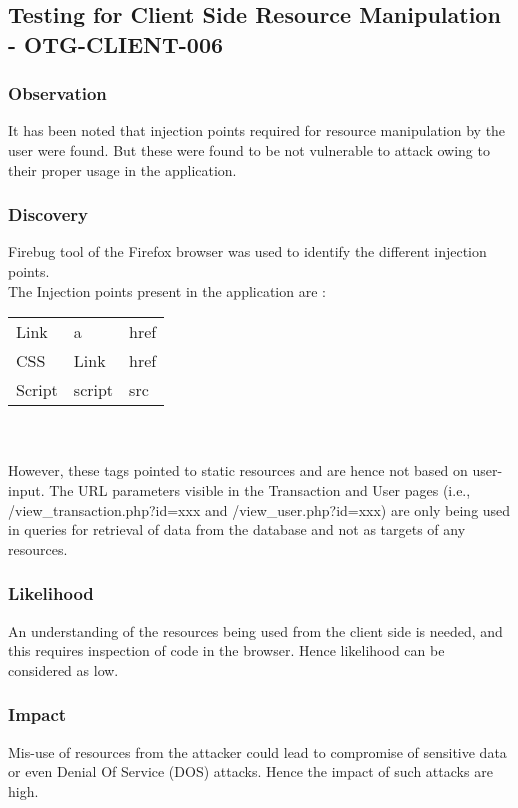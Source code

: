 \subsection{Testing for Client Side Resource Manipulation - OTG-CLIENT-006}

\subsubsection{Observation}
It has been noted that injection points required for resource manipulation by the user were found. But these were found to be not vulnerable to attack owing to their proper usage in the application.

\subsubsection{Discovery}
Firebug tool of the Firefox browser was used to identify the different injection points.\\
The Injection points present in the application are :\\
\begin{tabular}{l | l | l}
Link & a  & href \\
CSS & Link	& href \\
Script & script & src \\
\end{tabular}
\\\\However, these tags pointed to static resources and are hence not based on user-input.
The URL parameters visible in the Transaction and User pages (i.e., /view\_transaction.php?id=xxx and /view\_user.php?id=xxx) are only being used in queries for retrieval of data from the database and not as targets of any resources.

\subsubsection{Likelihood}
An understanding of the resources being used from the client side is needed, and this requires inspection of code in the browser. Hence likelihood can be considered as low.

\subsubsection{Impact}
Mis-use of resources from the attacker could lead to compromise of sensitive data or even Denial Of Service (DOS) attacks. Hence the impact of such attacks are high.

